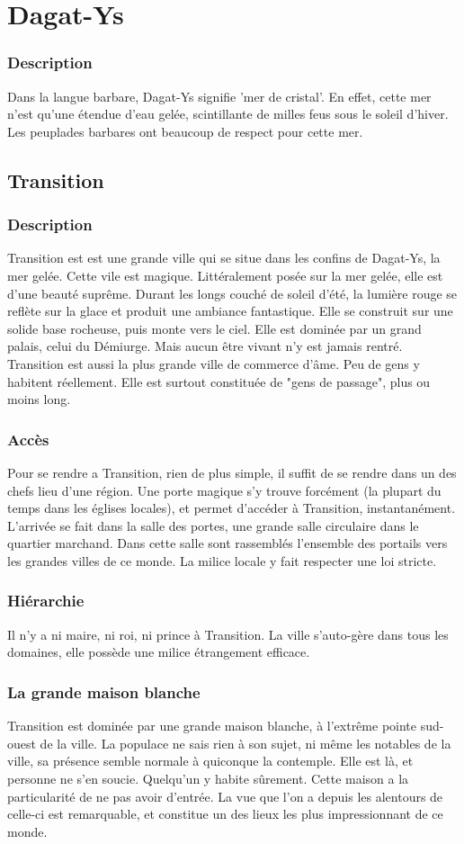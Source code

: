 \section{Dagat-Ys}
\subsubsection{Description}
\hypertarget {dagatys}{}Dans la langue barbare, Dagat-Ys signifie 'mer de cristal'.
En effet, cette mer n'est qu'une étendue d'eau gelée, scintillante de milles feus sous le soleil d'hiver.
Les peuplades barbares ont beaucoup de respect pour cette mer.
\subsection{Transition}
\subsubsection{Description}
\hypertarget {transition}{}
Transition est est une grande ville qui se situe dans les confins de Dagat-Ys, la mer gelée. 
Cette vile est magique. Littéralement posée sur la mer gelée, elle est d'une beauté suprême.
Durant les longs couché de soleil d'été, la lumière rouge se reflète sur la glace et produit une ambiance fantastique. Elle se construit sur une solide base rocheuse, puis monte vers le ciel.
Elle est dominée par un grand palais, celui du Démiurge. Mais aucun être vivant n'y est jamais rentré.
Transition est aussi la plus grande ville de commerce d'âme. Peu de gens y habitent réellement.
Elle est surtout constituée de "gens de passage", plus ou moins long.
\subsubsection{Accès}
Pour se rendre a Transition, rien de plus simple, il suffit de se rendre dans un des chefs lieu d'une région. Une porte magique s'y trouve forcément (la plupart du temps dans les églises locales), et permet d'accéder à Transition, instantanément.
L'arrivée se fait dans la salle des portes, une grande salle circulaire dans le quartier marchand. Dans cette salle sont rassemblés l'ensemble des portails vers les grandes villes de ce monde. La milice locale y fait respecter une loi stricte.
\subsubsection{Hiérarchie}
Il n'y a ni maire, ni roi, ni prince à Transition. La ville s'auto-gère dans tous les domaines, elle possède une milice étrangement efficace.
\subsubsection{La grande maison blanche}
Transition est dominée par une grande maison blanche, à l’extrême pointe sud-ouest de la ville. La populace ne sais rien à son sujet, ni même les notables de la ville, sa présence semble normale à quiconque la contemple. Elle est là, et personne ne s'en soucie. Quelqu'un y habite sûrement. Cette maison a la particularité de ne pas avoir d'entrée. La vue que l'on a depuis les alentours de celle-ci est remarquable, et constitue un des lieux les plus impressionnant de ce monde.